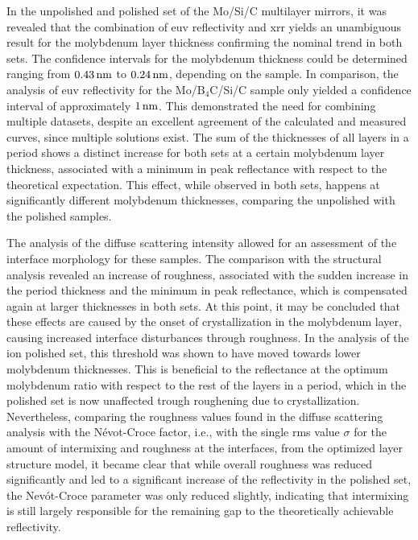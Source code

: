 In the unpolished and polished set of the Mo/Si/C multilayer mirrors, it was
revealed that the combination of \gls{euv} reflectivity and \gls{xrr} yields an
unambiguous result for the molybdenum layer thickness confirming the nominal
trend in both sets.
The confidence intervals for the molybdenum thickness could be determined
ranging from $\nm{0.43}$ to $\nm{0.24}$, depending on the sample.
In comparison, the analysis of \gls{euv} reflectivity for the Mo/B$_4$C/Si/C
sample only yielded a confidence interval of approximately $\nm{1}$.
This demonstrated the need for combining multiple datasets, despite an excellent
agreement of the calculated and measured curves, since multiple solutions exist.
The sum of the thicknesses of all layers in a period shows a distinct increase
for both sets at a certain molybdenum layer thickness, associated with a minimum
in peak reflectance with respect to the theoretical expectation.
This effect, while observed in both sets, happens at significantly different
molybdenum thicknesses, comparing the unpolished with the polished samples.

The analysis of the diffuse scattering intensity allowed for an assessment of
the interface morphology for these samples.
The comparison with the structural analysis revealed an increase of roughness,
associated with the sudden increase in the period thickness and the minimum in
peak reflectance, which is compensated again at larger thicknesses in both sets.
At this point, it may be concluded that these effects are caused by the onset of
crystallization in the molybdenum layer, causing increased interface
disturbances through roughness.
In the analysis of the ion polished set, this threshold was shown to have moved
towards lower molybdenum thicknesses.
This is beneficial to the reflectance at the optimum molybdenum ratio with
respect to the rest of the layers in a period, which in the polished set is now
unaffected trough roughening due to crystallization.
Nevertheless, comparing the roughness values found in the diffuse scattering
analysis with the N{\'e}vot-Croce factor, i.e., with the single \gls{rms} value
$\sigma$ for the amount of intermixing and roughness at the interfaces, from the
optimized layer structure model, it became clear that while overall roughness
was reduced significantly and led to a significant increase of the reflectivity
in the polished set, the Nev{\'o}t-Croce parameter was only reduced slightly,
indicating that intermixing is still largely responsible for the remaining gap
to the theoretically achievable reflectivity.


